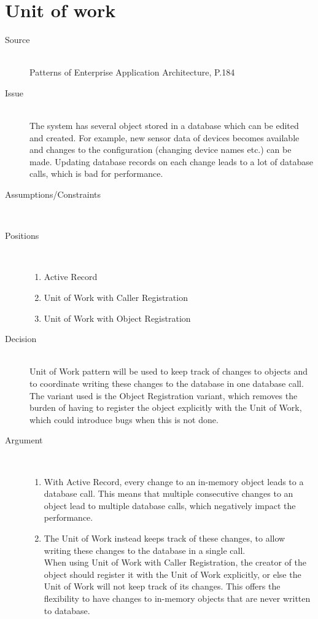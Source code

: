 \section{Unit of work}

\begin{description}
\item [Source]~\\
Patterns of Enterprise Application Architecture, P.184 \cite{Fowler:2002:PEA:579257}

\item [Issue]~\\
The system has several object stored in a database which can be edited and created. For example, new sensor data of devices becomes available and changes to the configuration (changing device names etc.) can be made. Updating database records on each change leads to a lot of database calls, which is bad for performance.

\item [Assumptions/Constraints]~\\

\item [Positions]~
\begin{enumerate}
\item Active Record
\item Unit of Work with Caller Registration
\item Unit of Work with Object Registration
\end{enumerate}

\item [Decision] ~\\
Unit of Work pattern will be used to keep track of changes to objects and to coordinate writing these changes to the database in one database call.
The variant used is the Object Registration variant, which removes the burden of having to register the object explicitly with the Unit of Work, which could introduce bugs when this is not done.

\item [Argument]~\\
\begin{enumerate}
\item With Active Record, every change to an in-memory object leads to a database call. This means that multiple consecutive changes to an object lead to multiple database calls, which negatively impact the performance.

\item The Unit of Work instead keeps track of these changes, to allow writing these changes to the database in a single call.\\ When using Unit of Work with Caller Registration, the creator of the object should register it with the Unit of Work explicitly, or else the Unit of Work will not keep track of its changes. This offers the flexibility to have changes to in-memory objects that are never written to database. 


\end{enumerate}
\end{description}
